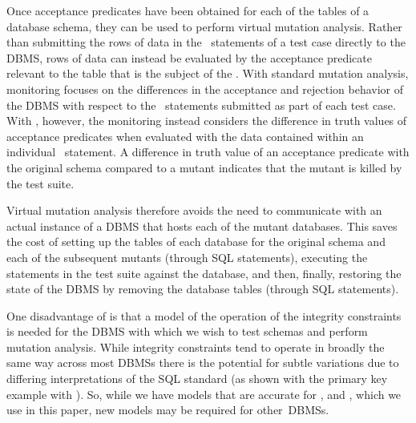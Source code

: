 

 Once acceptance predicates have been obtained for each of the tables of a database schema, they can be used to perform virtual mutation analysis. Rather than submitting the rows of data in the \INSERT~statements of a test case directly to the DBMS, rows of data can instead be evaluated by the acceptance predicate relevant to the table that is the subject of the \INSERT. With standard mutation analysis, monitoring focuses on the differences in the acceptance and rejection behavior of the DBMS with respect to the \INSERT~statements submitted as part of each test case. With \vma, however, the monitoring instead considers the difference in truth values of acceptance predicates when evaluated with the data contained within an individual \INSERT~statement. A difference in truth value of an acceptance predicate with the original schema compared to a mutant indicates that the mutant is killed by the test suite.



Virtual mutation analysis therefore avoids the need to communicate with an actual instance of a DBMS that hosts each of the mutant databases. This saves the cost of setting up the tables of each database for the original schema and each of the subsequent mutants (through SQL   statements), executing the \INSERT statements in the test suite against the database, and then, finally, restoring the state of the DBMS by removing the database tables (through SQL   statements).

One disadvantage of \vma is that a model of the operation of the integrity constraints is needed for the DBMS with which we wish to test schemas and perform mutation analysis. While integrity constraints tend to operate in broadly the same way across most DBMSs there is the potential for subtle variations due to differing interpretations of the SQL standard (as shown with the primary key example with \SQLite). So, while we have models that are accurate for \HyperSQL, \Postgres and \SQLite, which we use in this paper, new models may be required for \mbox{other DBMSs}.

